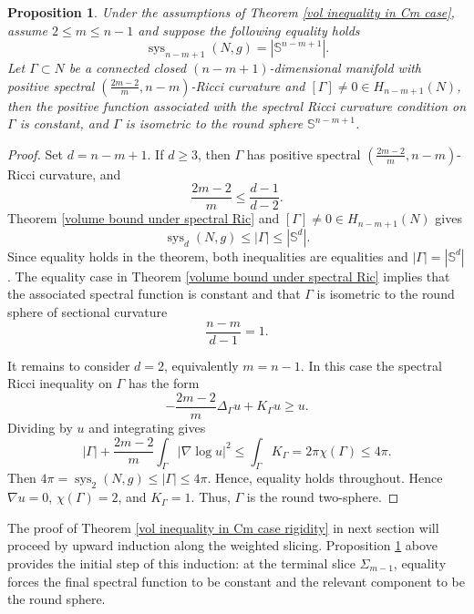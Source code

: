 \documentclass[11pt]{amsart}
\newtheorem{proposition}[theorem]{Proposition}
\theoremstyle{definition}
\theoremstyle{remark}
\numberwithin{equation}{section}
\begin{document}
\begin{proposition}\label{terminal-rigidity}
    Under the assumptions of Theorem \ref{vol inequality in Cm case}, assume $2\leq m\leq n-1$ and
      suppose the following equality holds 
    \[
        \operatorname{sys}_{n-m+1}(N,g)=|\mathbb{S}^{n-m+1}|.
    \]
    Let $\Gamma\subset N$ be a connected closed $(n-m+1)$-dimensional manifold with positive spectral
      $(\frac{2m-2}{m},n-m)$-Ricci curvature and $[\Gamma]\neq 0\in H_{n-m+1}(N)$, then the
      positive function associated with the spectral Ricci curvature condition on $\Gamma$
      is constant, and $\Gamma$ is isometric to the round sphere $\mathbb{S}^{n-m+1}$.
\end{proposition}
\begin{proof}
    Set $d=n-m+1$. 
    If $d\geq3$, then $\Gamma$ has positive spectral
      $(\frac{2m-2}{m},n-m)$-Ricci curvature, and
    \[
        \frac{2m-2}{m}\leq\frac{d-1}{d-2}.
    \]
    Theorem \ref{volume bound under spectral Ric} and $[\Gamma]\neq 0\in H_{n-m+1}(N)$ gives
    \[
        \operatorname{sys}_{d}(N,g)\leq |\Gamma|\leq |\mathbb{S}^{d}|.
    \]
    Since equality holds in the theorem, both inequalities are equalities and
      $|\Gamma|=|\mathbb{S}^{d}|$.
    The equality case in Theorem \ref{volume bound under spectral Ric} implies that the associated
      spectral function is constant and that $\Gamma$ is isometric to the round sphere of sectional
      curvature
    \[
        \frac{n-m}{d-1}=1.
    \]

    It remains to consider $d=2$, equivalently $m=n-1$. In this case the spectral Ricci
      inequality on $\Gamma$ has the form
    \[
        -\frac{2m-2}{m}\Delta_{\Gamma}u+K_{\Gamma}u\geq u.
    \]
    Dividing by $u$ and integrating gives
    \[
        |\Gamma|+\frac{2m-2}{m}\int_{\Gamma}|\nabla\log u|^2
          \leq \int_{\Gamma}K_{\Gamma}=2\pi\chi(\Gamma)\leq4\pi.
    \]
    Then $4\pi=\operatorname{sys}_{2}(N,g)\leq|\Gamma|\leq4\pi$. Hence, equality holds throughout. Hence
      $\nabla u=0$, $\chi(\Gamma)=2$, and $K_{\Gamma}=1$. Thus, $\Gamma$ is the round two-sphere.
\end{proof}

The proof of Theorem \ref{vol inequality in Cm case rigidity} in next section will proceed by upward
  induction along the weighted slicing. Proposition \ref{terminal-rigidity} above provides the initial
  step of this induction: at the terminal slice $\Sigma_{m-1}$, equality forces the final spectral
  function to be constant and the relevant component to be the round sphere.
    
\end{document}
